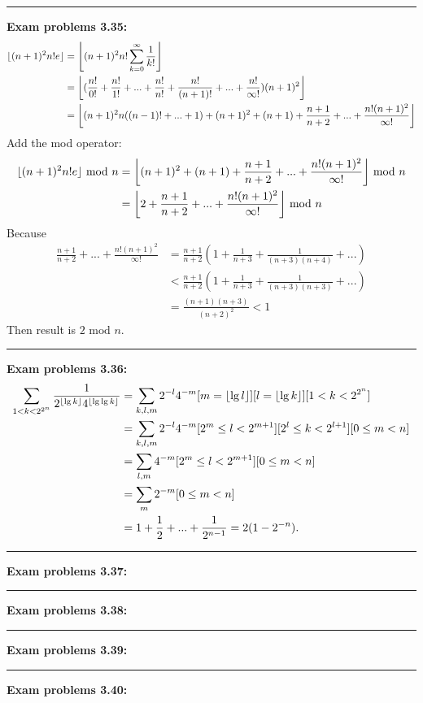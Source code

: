 \documentclass{article}
\DeclarePairedDelimiter\floor{\lfloor}{\rfloor}
\begin{document}
\noindent\rule{\textwidth}{0.4pt}
\textbf{Exam problems 3.35:}
\begin{align}
\floor{(n+1)^2 n! e} &= \floor*{(n+1)^2 n! \sum_{k=0}^{\infty}\frac{1}{k!} } \\
		     &= \floor*{(\frac{n!}{0!} + \frac{n!}{1!} + ... + \frac{n!}{n!} + \frac{n!}{(n+1)!} + ... + \frac{n!}{\infty!})(n+1)^2}\\
		     &= \floor*{(n+1)^2 n ((n-1)! + ... + 1) + (n+1)^2 + (n+1) + \frac{n+1}{n+2} + ... + \frac{n!(n+1)^2}{\infty!}} \\
\end{align}
Add the mod operator:
\begin{align}
\floor{(n+1)^2 n! e} \text{ mod } n &= \floor*{(n+1)^2 + (n+1) + \frac{n+1}{n+2} + ... + \frac{n!(n+1)^2}{\infty!}} \text{ mod } n \\
				    &= \floor*{2 + \frac{n+1}{n+2} + ... + \frac{n!(n+1)^2}{\infty!}} \text{ mod } n
\end{align}
Because 
\begin{align}
\frac{n+1}{n+2} + ... + \frac{n!(n+1)^2}{\infty!} &= \frac{n+1}{n+2}(1 + \frac{1}{n+3} + \frac{1}{(n+3)(n+4)} + ... ) \\
						  &< \frac{n+1}{n+2}(1 + \frac{1}{n+3} + \frac{1}{(n+3)(n+3)} + ...) \\
						  &= \frac{(n+1)(n+3)}{(n+2)^2} < 1
\end{align}
Then result is $2 \text{ mod } n$.

\noindent\rule{\textwidth}{0.4pt}
\textbf{Exam problems 3.36:}
\begin{align}
\sum_{1 < k < 2^{2^n}}{\frac{1}{2^{\floor{\lg k}}4^{\floor{\lg \lg k}}}} &= \sum_{k,l,m} 2^{-l} 4^{-m} [m = \floor{\lg l}][l = \floor{\lg k}][1 < k < 2^{2^n}] \\
									 &= \sum_{k,l,m} 2^{-l} 4^{-m} [2^m \le l < 2^{m+1}][2^l \le k < 2^{l+1}][0 \le m < n] \\
									 &= \sum_{l,m} 4^{-m}[2^m \le l < 2^{m+1}][0 \le m < n] \\
									 &= \sum_{m} 2^{-m}[0 \le m < n] \\
									 &= 1 + \frac{1}{2} + ... + \frac{1}{2^{n-1}} = 2(1 - 2^{-n}).
\end{align}


\noindent\rule{\textwidth}{0.4pt}
\textbf{Exam problems 3.37:}

\noindent\rule{\textwidth}{0.4pt}
\textbf{Exam problems 3.38:}

\noindent\rule{\textwidth}{0.4pt}
\textbf{Exam problems 3.39:}

\noindent\rule{\textwidth}{0.4pt}
\textbf{Exam problems 3.40:}
\end{document}
